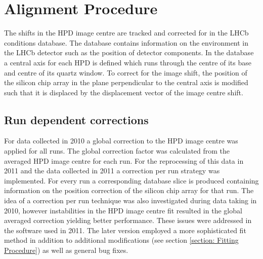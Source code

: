 \section{Alignment Procedure}
\label{chap: application of correction factors}
The shifts in the HPD image centre are tracked and corrected for in the LHCb conditions database. The database contains information on the environment in the LHCb detector such as the position of detector components. In the database a central axis for each HPD is defined which runs through the centre of its base and centre of its quartz window. To correct for the image shift, the position of the silicon chip array in the plane perpendicular to the central axis is modified such that it is displaced by the displacement vector of the image centre shift. 

\subsection{Run dependent corrections}
For data collected in 2010 a global correction to the HPD image centre was applied for all runs. The global correction factor was calculated from the averaged HPD image centre for each run.  For the reprocessing of this data in 2011 and the data collected in 2011 a correction per run strategy was implemented. For every run a corresponding database slice is produced containing information on the position correction of the silicon chip array for that run. The idea of a correction per run technique was also investigated during data taking in 2010, however instabilities in the HPD image centre fit resulted in the global averaged correction yielding better performance. These issues were addressed in the software used in 2011. The later version employed a more sophisticated fit method in addition to additional modifications (see section \ref{section: Fitting Procedure}) as well as general bug fixes.

